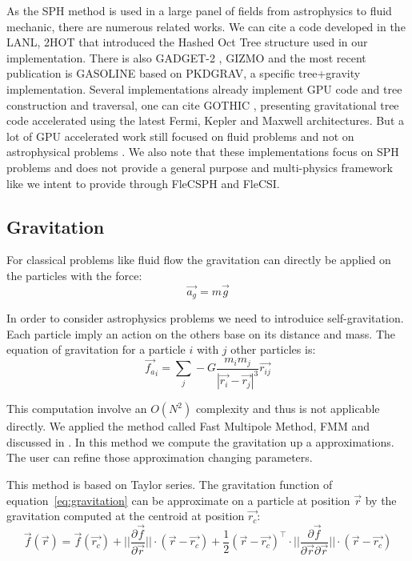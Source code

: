 As the SPH method is used in a large panel of fields from astrophysics to fluid mechanic, there are numerous related works. 
We can cite a code developed in the LANL, 2HOT \cite{warren20132hot} that introduced the Hashed Oct Tree structure used in our implementation. 
There is also GADGET-2 \cite{springel2005cosmological}, GIZMO \cite{hopkins2014gizmo} and the most recent publication is GASOLINE \cite{wadsley2017gasoline2} based on PKDGRAV, a specific tree+gravity implementation. 
Several implementations already implement GPU code and tree construction and traversal, one can cite GOTHIC \cite{miki2017gothic}, presenting gravitational tree code accelerated using the latest Fermi, Kepler and Maxwell architectures. But a lot of GPU accelerated work still focused on fluid problems and not on astrophysical problems  \cite{harada2007smoothed,crespo2011gpus}.
We also note that these implementations focus on SPH problems and does not provide a general purpose and multi-physics framework like we intent to provide through FleCSPH and FleCSI. 

\subsection{Gravitation}
For classical problems like fluid flow the gravitation can directly be applied on the particles with the force:
\begin{equation}
	\vec{a_g} = m\vec{g}
\end{equation}

In order to consider astrophysics problems we need to introduice self-gravitation. 
Each particle imply an action on the others base on its distance and mass. 
The equation of gravitation for a particle $i$ with $j$ other particles is: 
\begin{equation}
	\vec{f_a}_i = \sum_j -G \frac{m_i m_j}{|\vec{r_i}-\vec{r_j}|^3} \vec{r_{ij}}
	\label{eq:gravitation}
\end{equation}

This computation involve an $O(N^2)$ complexity and thus is not applicable directly. 
We applied the method called Fast Multipole Method, FMM and discussed in \cite{beatson1997short}.
In this method we compute the gravitation up a approximations. 
The user can refine those approximation changing parameters. 

This method is based on Taylor series.
The gravitation function of equation~\ref{eq:gravitation} can be approximate on a particle at position $\vec{r}$ by the gravitation computed at the centroid at position $\vec{r_c}$: 
\begin{equation}
 \vec{f}(\vec{r}) = \vec{f}(\vec{r_c}) + ||\frac{\partial\vec{f}}{\partial\vec{r}}||\cdot (\vec{r} - \vec{r_c}) + \frac{1}{2} (\vec{r}-\vec{r_c})^\intercal \cdot   ||\frac{\partial\vec{f}}{\partial\vec{r} \partial\vec{r}}|| \cdot (\vec{r} - \vec{r_c})
 \end{equation}

